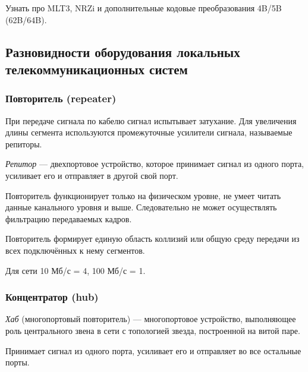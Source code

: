\documentclass[12pt, russian, oneside, article]{ncc}
\begin{document}
Узнать про MLT3, NRZi и дополнительные кодовые преобразования 4B/5B (62B/64B).
\subsection{Разновидности оборудования локальных телекоммуникационных систем}
\label{sec-4_8}
\subsubsection{Повторитель (repeater)}
\label{sec-4_8_1}


При передаче сигнала по кабелю сигнал испытывает затухание. Для увеличения длины сегмента используются промежуточные усилители сигнала, называемые репиторы.

\emph{Репитор} --- двехпортовое устройство, которое принимает сигнал из одного порта, усиливает его и отправляет в другой свой порт.

Повторитель функционирует только на физическом уровне, не умеет читать данные канального уровня и выше. Следовательно не может осуществлять фильтрацию передаваемых кадров.

Повторитель формирует единую область коллизий или общую среду передачи из всех подключённых к нему сегментов.

Для сети 10 Мб/с = 4, 100 Мб/с = 1.
\subsubsection{Концентратор (hub)}
\label{sec-4_8_2}


\emph{Хаб} (многопортовый повторитель) --- многопортовое устройство, выполняющее роль центрального звена в сети с топологией звезда, построенной на витой паре.

Принимает сигнал из одного порта, усиливает его и отправляет во все остальные порты.
\end{document}
